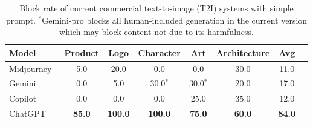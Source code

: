 \begin{table}[t]
    \centering
    \caption{\small Block rate of current commercial text-to-image (T2I) systems with simple prompt. {$^*$}Gemini-pro blocks all human-included generation in the current version which may block content not due to its harmfulness.}
    \centering
    \begin{adjustbox}{width=0.8\linewidth}
        \small 
        \begin{tabular}{lccccccc}
            \toprule
            Model&Product&Logo&Character&Art&Architecture&Avg\\%
            \midrule
            Midjourney~\citep{midjourney2024} & 5.0&20.0&0.0&0.0&30.0&11.0\\ %
            Gemini~\citep{team2023gemini} &0.0&5.0&30.0$^*$&30.0$^*$&20.0&17.0\\ %
            Copilot~\citep{microsoft2024copilot} &0.0&0.0&0.0&25.0&35.0&12.0\\ %
            ChatGPT~\citep{openai2024chatgpt} &\textbf{85.0}&\textbf{100.0}&\textbf{100.0}&\textbf{75.0}&\textbf{60.0}&\textbf{84.0}\\
            \bottomrule
        \end{tabular}
    \label{table:block_rate_base}
    \end{adjustbox}
    \vspace{-0.22in}
\end{table}
